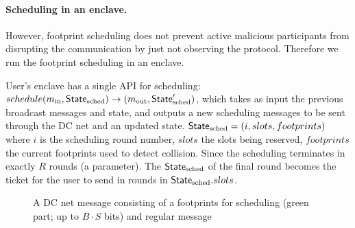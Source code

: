 
\paragraph{Scheduling in an enclave.} However, footprint scheduling does not prevent active malicious participants from disrupting the communication by just not observing the protocol. Therefore we run the footprint scheduling in an enclave.

User's enclave has a single API for scheduling: $schedule(m_\text{in}, \mathsf{State}_\text{sched}) \to (m_\text{out}, \mathsf{State}_\text{sched}')$, which takes as input the previous broadcast messages and state, and outputs a new scheduling messages to be sent through the DC net and an updated state. $\mathsf{State}_\text{sched}=(i, slots, footprints)$ where $i$ is the scheduling round number, $slots$ the slots being reserved, $footprints$ the current footprints used to detect collision. Since the scheduling terminates in exactly $R$ rounds (a parameter). The $\mathsf{State}_\text{sched}$ of the final round becomes the ticket for the user to send in rounds in $\mathsf{State}_\text{sched}.slots$.

\begin{figure}[H]
    \centering
    \caption{A DC net message consisting of a footprints for scheduling  (green part; up to $B\cdot S$ bits) and regular message}
    \label{fig:message}
\end{figure}

